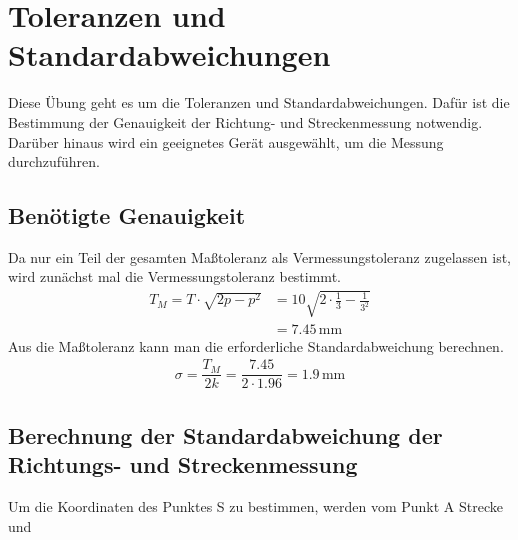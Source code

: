 \documentclass[12pt
,headinclude
,headsepline
,bibtotocnumbered
]{scrartcl}
\begin{document}
\section{Toleranzen und Standardabweichungen}
Diese Übung geht es um die Toleranzen und Standardabweichungen. Dafür ist die Bestimmung der Genauigkeit der Richtung- und Streckenmessung notwendig. 
Darüber hinaus wird ein geeignetes Gerät ausgewählt, um die Messung durchzuführen.
\subsection{Benötigte Genauigkeit}
Da nur ein Teil der gesamten Maßtoleranz als Vermessungstoleranz zugelassen ist,
wird zunächst mal die Vermessungstoleranz bestimmt.
\begin{align*}
    T_M=T\cdot\sqrt{2p-p^2}&=10\sqrt{2\cdot\frac{1}{3}-\frac{1}{3^2}}\\
    &=7.45\,\mathrm{mm}
\end{align*}
Aus die Maßtoleranz kann man die erforderliche Standardabweichung berechnen.
\begin{align*}
    \sigma=\dfrac{T_M}{2k}=\dfrac{7.45}{2\cdot 1.96}=1.9\,\mathrm{mm}
\end{align*}
\subsection{Berechnung der Standardabweichung der Richtungs- und Streckenmessung}
Um die Koordinaten des Punktes S zu bestimmen, werden vom Punkt A Strecke und   
\end{document}
